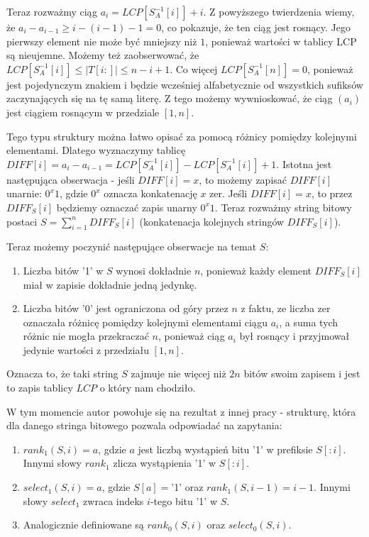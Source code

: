 \documentclass{article}
\begin{document}
Teraz rozważmy ciąg $a_i = LCP[S_A^{-1}[i]] + i$. Z powyższego twierdzenia wiemy, że $a_i - a_{i-1} \ge i - (i-1) - 1 = 0$, co pokazuje, że ten ciąg jest rosnący. Jego pierwszy element nie może być mniejszy niż $1$, ponieważ wartości w tablicy LCP są nieujemne. Możemy też zaobserwować, że $LCP[S_A^{-1}[i]] \le |T[i:]| \le n-i+1$. Co więcej $LCP[S_A^{-1}[n]] = 0$, ponieważ jest pojedynczym znakiem i będzie wcześniej alfabetycznie od wszystkich sufiksów zaczynających się na tę samą literę. Z tego możemy wywnioskować, że ciąg $(a_i)$ jest ciągiem rosnącym w przedziale $[1,n]$.

Tego typu struktury można łatwo opisać za pomocą różnicy pomiędzy kolejnymi elementami. Dlatego wyznaczymy tablicę $DIFF[i] = a_i - a_{i-1} = LCP[S_A^{-1}[i]] - LCP[S_A^{-1}[i]] + 1$. Istotna jest następująca obserwacja - jeśli $DIFF[i] = x$, to możemy zapisać $DIFF[i]$ unarnie: $0^x1$, gdzie $0^x$ oznacza konkatenację $x$ zer. Jeśli $DIFF[i] = x$, to przez $DIFF_S[i]$ będziemy oznaczać zapis unarny $0^x1$. Teraz rozważmy string bitowy postaci $S = \sum_{i=1}^n DIFF_S[i]$ (konkatenacja kolejnych stringów $DIFF_S[i]$).

Teraz możemy poczynić następujące obserwacje na temat $S$:
\begin{enumerate}
    \item Liczba bitów '1' w $S$ wynosi dokładnie $n$, ponieważ każdy element $DIFF_S[i]$ miał w zapisie dokładnie jedną jedynkę.
    \item Liczba bitów '0' jest ograniczona od góry przez $n$ z faktu, ze liczba zer oznaczała różnicę pomiędzy kolejnymi elementami ciągu $a_i$, a suma tych różnic nie mogła przekraczać $n$, ponieważ ciąg $a_i$ był rosnący i przyjmował jedynie wartości z przedziału $[1,n]$.
\end{enumerate}

Oznacza to, że taki string $S$ zajmuje nie więcej niż $2n$ bitów swoim zapisem i jest to zapis tablicy $LCP$ o który nam chodziło.

W tym momencie autor powołuje się na rezultat z innej pracy - strukturę, która dla danego stringa bitowego pozwala odpowiadać na zapytania:
\begin{enumerate}
    \item $rank_1(S, i) = a$, gdzie $a$ jest liczbą wystąpień bitu '1' w prefiksie $S[:i]$. Innymi słowy $rank_1$ zlicza wystąpienia '1' w $S[:i]$.
    \item $select_1(S, i) = a$, gdzie $S[a] = $'1' oraz $rank_1(S, i-1) = i-1$. Innymi słowy $select_1$ zwraca indeks $i$-tego bitu '1' w $S$.
    \item Analogicznie definiowane są $rank_0(S, i)$ oraz $select_0(S, i)$.
\end{enumerate}
\end{document}
